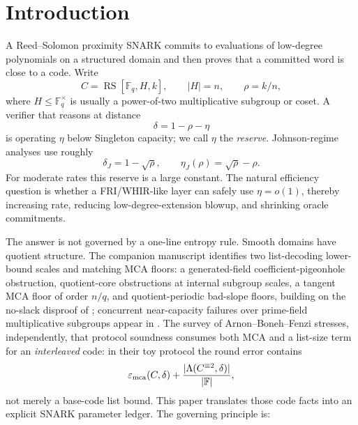 \documentclass[11pt]{article}
\theoremstyle{definition}
\newcommand{\F}{\mathbb F}
\newcommand{\RS}{\operatorname{RS}}
\newcommand{\mca}{\varepsilon_{\rm mca}}
\newcommand{\Int}[2]{#1^{\equiv #2}}
\begin{document}
\tableofcontents

\section{Introduction}
\label{sec:intro}

A Reed--Solomon proximity SNARK commits to evaluations of low-degree polynomials on a structured domain and then proves that a committed word is close to a code.  Write
\[
        C=\RS[\F_q,H,k],\qquad |H|=n,
        \qquad \rho=k/n,
\]
where $H\le \F_q^\times$ is usually a power-of-two multiplicative subgroup or coset.  A verifier that reasons at distance
\[
        \delta=1-\rho-\eta
\]
is operating $\eta$ below Singleton capacity; we call $\eta$ the \emph{reserve}.  Johnson-regime analyses \cite{Joh62,GS99,BCIKS20} use roughly
\[
        \delta_J=1-\sqrt\rho,
        \qquad
        \eta_J(\rho)=\sqrt\rho-\rho .
\]
For moderate rates this reserve is a large constant.  The natural efficiency question is whether a FRI/WHIR-like layer \cite{FRI,ACFY25} can safely use $\eta=o(1)$, thereby increasing rate, reducing low-degree-extension blowup, and shrinking oracle commitments.

The answer is not governed by a one-line entropy rule.  Smooth domains have quotient structure.  The companion manuscript \cite{SlackMCAEntropyMerged} identifies two list-decoding lower-bound scales and matching MCA floors: a generated-field coefficient-pigeonhole obstruction, quotient-core obstructions at internal subgroup scales, a tangent MCA floor of order $n/q$, and quotient-periodic bad-slope floors, building on the no-slack disproof of \cite{NoSlack}; concurrent near-capacity failures over prime-field multiplicative subgroups appear in \cite{KKH26,Kambire26}.  The survey of Arnon--Boneh--Fenzi \cite{ABF26} stresses, independently, that protocol soundness consumes both MCA and a list-size term for an \emph{interleaved} code: in their toy protocol the round error contains
\[
        \mca(C,\delta)+\frac{|\Lambda(\Int{C}{2},\delta)|}{|\F|},
\]
not merely a base-code list bound.  This paper translates those code facts into an explicit SNARK parameter ledger.  The governing principle is:
\begin{center}
\end{center}
\end{document}
